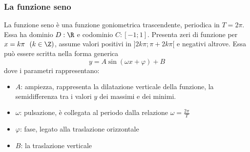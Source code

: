 \documentclass{article}     %
\begin{document}
    \subsubsection{La funzione seno}
        La funzione seno è una funzione goniometrica trascendente, periodica in $T=2\pi$. Essa ha dominio $D:\R$ e codominio $C:[-1;1]$. Presenta zeri di funzione per $x=k\pi~~(k\in\Z)$, assume valori positivi in $]2k\pi;\pi+2k\pi[$ e negativi altrove. Essa può essere scritta nella forma generica \[y=A\sin(\omega x +\varphi)+B\] dove i parametri rappresentano:
        \begin{itemize}
            \item $A$: ampiezza, rappresenta la dilatazione verticale della funzione, la semidifferenza tra i valori $y$ dei massimi e dei minimi.
            \item $\omega$: pulsazione, è collegata al periodo dalla relazione $\omega =\frac{2\pi}{T}$
            \item $\varphi$: fase, legato alla traslazione orizzontale
            \item $B$: la traslazione verticale
        \end{itemize}
        \begin{figure}[ht]
            \centering
            \begin{center}
            \end{center}
        \end{figure}
        
\end{document}
